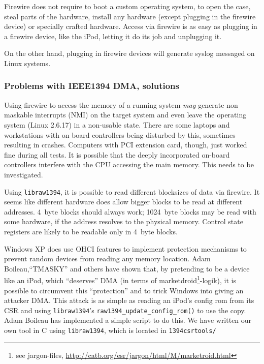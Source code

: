 Firewire does not require to boot a custom operating system, to open the case,
steal parts of the hardware, install any hardware (except plugging in the
firewire device) or specially crafted hardware.  Access via firewire is as easy
as plugging in a firewire device, like the iPod, letting it do its job and
unplugging it.


On the other hand, plugging in firewire devices will generate syslog messaged on
Linux systems.

\pagebreak

\subsubsection{Problems with IEEE1394 DMA, solutions}

Using firewire to access the memory of a running system \emph{may} generate non
maskable interrupts (NMI) on the target system and even leave the operating
system (Linux 2.6.17) in a non-usable state. There are some laptops and
workstations with on board controllers being disturbed by this, sometimes
resulting in crashes. Computers with PCI extension card, though, just worked
fine during all tests. It is possible that the deeply incorporated on-board
controllers interfere with the CPU accessing the main memory. This needs to be
investigated.


Using \texttt{libraw1394}, it is possible to read different blocksizes of data
via firewire.  It seems like different hardware does allow bigger blocks to be
read at different addresses. 4~byte blocks should always work; 1024~byte blocks
may be read with some hardware, if the address resolves to the physical memory.
Control state registers are likely to be readable only in 4~byte blocks.

\label{windows-dma} Windows XP does use OHCI features to implement protection
mechanisms to prevent random devices from reading any memory location.  Adam
Boileau,``TMASKY'' and others have shown \cite{rux2k6firewire:2006} that, by
pretending to be a device like an iPod, which ``deserves'' DMA (in terms of
marketdroid\footnote{see jargon-files,
\href{http://catb.org/esr/jargon/html/M/marketroid.html}
{http://catb.org/esr/jargon/html/M/marketroid.html}}-logik), it is possible to
circumvent this ``protection'' and to trick Windows into giving an attacker DMA.
This attack is as simple as reading an iPod's config rom from its CSR and using
\texttt{libraw1394}'s \texttt{raw1394\_update\_config\_rom()} to use the copy.
Adam Boileau has implemented a simple script to do this. We have written our own
tool in C using \texttt{libraw1394}, which is located in \texttt{1394csrtools/}



